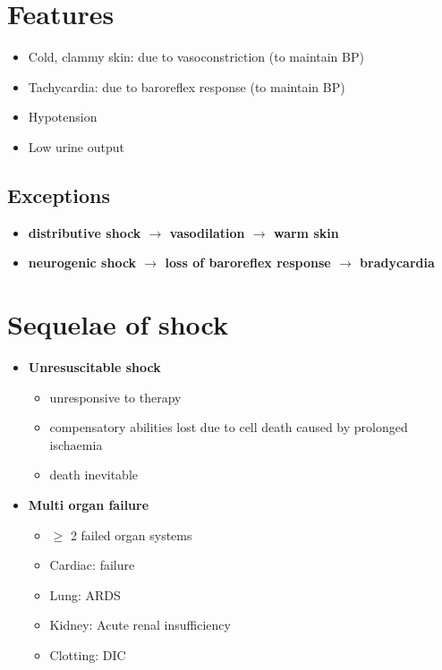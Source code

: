 \documentclass[
  12pt,
]{memoir}
\providecommand{\tightlist}{%
  \setlength{\itemsep}{0pt}\setlength{\parskip}{0pt}}
\begin{document}
\hypertarget{features}{%
\section{Features}\label{features}}

\begin{itemize}
\tightlist
\item
  Cold, clammy skin: due to vasoconstriction (to maintain BP)
\item
  Tachycardia: due to baroreflex response (to maintain BP)
\item
  Hypotension
\item
  Low urine output
\end{itemize}

\hypertarget{exceptions}{%
\subsection{Exceptions}\label{exceptions}}

\begin{itemize}
\tightlist
\item
  \textbf{distributive shock \(\rightarrow\) vasodilation
  \(\rightarrow\) warm skin}
\item
  \textbf{neurogenic shock \(\rightarrow\) loss of baroreflex response
  \(\rightarrow\) bradycardia}
\end{itemize}

\hypertarget{sequelae-of-shock}{%
\section{Sequelae of shock}\label{sequelae-of-shock}}

\begin{itemize}
\tightlist
\item
  \textbf{Unresuscitable shock}

  \begin{itemize}
  \tightlist
  \item
    unresponsive to therapy
  \item
    compensatory abilities lost due to cell death caused by prolonged
    ischaemia
  \item
    death inevitable
  \end{itemize}
\item
  \textbf{Multi organ failure}

  \begin{itemize}
  \tightlist
  \item
    \(\ge\) 2 failed organ systems
  \item
    Cardiac: failure
  \item
    Lung: ARDS
  \item
    Kidney: Acute renal insufficiency
  \item
    Clotting: DIC
  \end{itemize}
\end{itemize}
\end{document}
